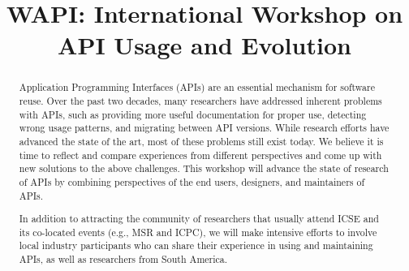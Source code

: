 \documentclass[10pt, conference]{IEEEtran}
\newcommand{\shortname}{WAPI}
\begin{document}
\title{\shortname{}: International Workshop on API Usage and Evolution}


\newcommand\tud[0]{\textsuperscript{\normalfont \textdagger}}
\newcommand\iowa[0]{\textsuperscript{\normalfont \textparagraph}}
\newcommand\utd[0]{\textsuperscript{\normalfont \ddag}}
\newcommand\lanu[0]{\textsuperscript{\normalfont \textsection}}
\newcommand\ualberta[0]{\textsuperscript{\normalfont \textasteriskcentered}}

\author{
\and
{}
\and
{}
\and
{}
}


\maketitle


\begin{abstract}
Application Programming Interfaces (APIs) are an essential mechanism for software reuse. Over the past two decades, many researchers have addressed inherent problems with APIs, such as providing more useful documentation for proper use, detecting wrong usage patterns, and migrating between API versions. While research efforts have advanced the state of the art, most of these problems still exist today. We believe it is time to reflect and compare experiences from different perspectives and come up with new solutions to the above challenges. This workshop will advance the state of research of APIs by combining perspectives of the end users, designers, and maintainers of APIs.

In addition to attracting the community of researchers that usually attend ICSE and its co-located events (e.g., MSR and ICPC), we will make intensive efforts to involve local industry participants who can share their experience in using and maintaining APIs, as well as researchers from South America.
\end{abstract}
\end{document}
